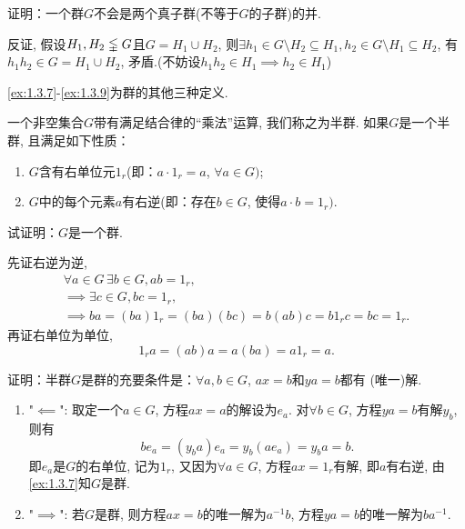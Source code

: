 \begin{problem}
    证明：一个群$G$不会是两个真子群(不等于$G$的子群)的并.
\end{problem}

\begin{solution}
    反证, 假设$H_1, H_2 \lvertneqq G$且$G = H_1 \cup H_2$,
则$\exists h_1 \in G \setminus H_2 \subseteq H_1, h_2 \in G \setminus H_1 \subseteq H_2$,
有$h_1h_2 \in G = H_1 \cup H_2$, 矛盾.(不妨设$h_1h_2 \in H_1 \implies h_2 \in H_1$)
\end{solution}

\ref{ex:1.3.7}-\ref{ex:1.3.9}为群的其他三种定义.

\begin{problem}\label{ex:1.3.7}
    一个非空集合$G$带有满足结合律的“乘法”运算, 我们称之为半群.
如果$G$是一个半群, 且满足如下性质：
\begin{enumerate}[(1)]
    \item $G$含有右单位元$1_r$(即：$a \cdot 1_r = a$, $\forall a \in G)$;
    \item $G$中的每个元素$a$有右逆(即：存在$b \in G$, 使得$a \cdot b = 1_r)$.
\end{enumerate}
试证明：$G$是一个群.
\end{problem}

\begin{solution}
    先证右逆为逆, 
\[
\begin{gathered}
    \forall a \in G \, \exists b \in G, ab = 1_r,\\
    \implies \exists c \in G, bc = 1_r,\\
    \implies ba = (ba)1_r = (ba)(bc) = b(ab)c = b1_rc = bc = 1_r.
\end{gathered}
\]
    再证右单位为单位, 
\[
    1_ra = (ab)a = a(ba) = a1_r = a.
\]
\end{solution}

\begin{problem}\label{ex:1.3.8}
    证明：半群$G$是群的充要条件是：$\forall a, b \in G$, $ax = b$和$ya = b$都有
(唯一)解.
\end{problem}

\begin{solution}
\begin{enumerate}[(1)]
    \item "$\impliedby$": 取定一个$a \in G$, 方程$ax = a$的解设为$e_a$.
对$\forall b \in G$, 方程$ya = b$有解$y_b$, 则有
\[
    be_a = (y_ba)e_a = y_b(ae_a) = y_ba = b.
\]
即$e_a$是$G$的右单位, 记为$1_r$, 又因为$\forall a \in G$,
方程$ax = 1_r$有解, 即$a$有右逆, 由\ref{ex:1.3.7}知$G$是群.
    \item "$\implies$": 若$G$是群, 则方程$ax = b$的唯一解为$a^{-1}b$,
方程$ya = b$的唯一解为$ba^{-1}$.
\end{enumerate}
    
\end{solution}


